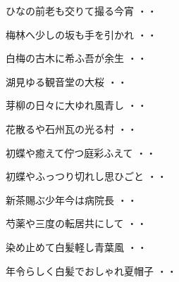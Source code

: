 \begin{shiika}ひなの前老も交りて撮る今宵
\hfill{・・}\end{shiika}
\vspace{0.6cm}
\begin{shiika}梅林へ少しの坂も手を引かれ
\hfill{・・}\end{shiika}
\vspace{0.6cm}
\begin{shiika}白梅の古木に希ふ吾が余生
\hfill{・・}\end{shiika}
\vspace{0.6cm}
\begin{shiika}湖見ゆる観音堂の大桜
\hfill{・・}\end{shiika}
\vspace{0.6cm}
\begin{shiika}芽柳の日々に大ゆれ風青し
\hfill{・・}\end{shiika}
\vspace{0.6cm}
\begin{shiika}花散るや石州瓦の光る村
\hfill{・・}\end{shiika}
\vspace{0.6cm}
\begin{shiika}初蝶や癒えて佇つ庭彩ふえて
\hfill{・・}\end{shiika}
\vspace{0.6cm}
\begin{shiika}初蝶やふっつり切れし思ひごと
\hfill{・・}\end{shiika}
\vspace{0.6cm}
\begin{shiika}新茶賜ぶ少年今は病院長
\hfill{・・}\end{shiika}
\vspace{0.6cm}
\begin{shiika}芍薬や三度の転居共にして
\hfill{・・}\end{shiika}
\vspace{0.6cm}
\begin{shiika}染め止めて白髪軽し青葉風
\hfill{・・}\end{shiika}
\vspace{0.6cm}
\begin{shiika}年令らしく白髪でおしゃれ夏帽子
\hfill{・・}\end{shiika}
